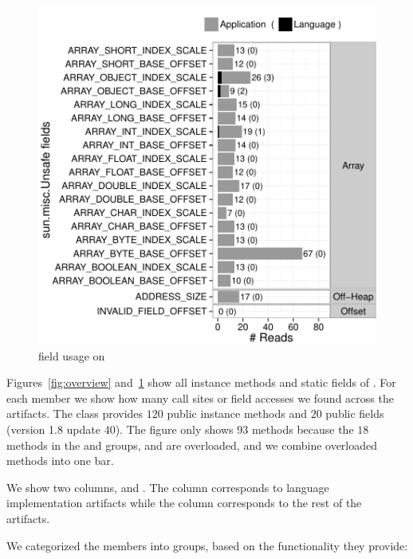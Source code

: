 \begin{figure}[!ht]
\centering
\includegraphics[width=0.7\columnwidth]{chapters/unsafe/usage-maven-fields}
\caption{\smu{} field usage on \mavencentral{}}
\label{fig:overview-field}
\end{figure}

Figures~\ref{fig:overview} and~\ref{fig:overview-field} show all instance methods and static fields of \smu{}. For each member we show how many call sites or field accesses we found across the artifacts. The class provides $120$ public instance methods and $20$ public fields (version 1.8 update 40). The figure only shows $93$ methods because the $18$ methods in the  and  groups, and  are overloaded, and we combine overloaded methods into one bar.

We show two columns,  and .
The  column corresponds to language implementation artifacts while the  column corresponds to the rest of the artifacts.

We categorized the members into groups, based on the functionality they provide:

